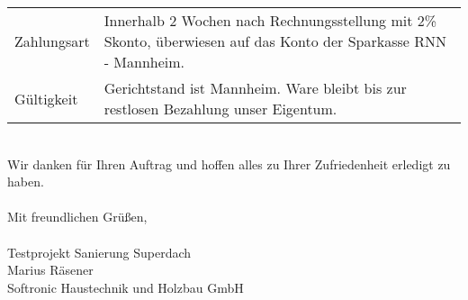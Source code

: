 \documentclass[10pt,a4paper]{letter}
\begin{document}
\begin{letter}
\begin{tabular}{ll}
Zahlungsart & {\parbox[t]{10cm}{Innerhalb 2 Wochen nach Rechnungsstellung mit 2\% Skonto, überwiesen auf das Konto der Sparkasse RNN - Mannheim.}}\\
Gültigkeit & {\parbox[t]{10cm}{Gerichtstand ist Mannheim. Ware bleibt bis zur restlosen Bezahlung unser Eigentum.}}\\
\end{tabular}
\\
Wir danken für Ihren Auftrag und hoffen alles zu Ihrer Zufriedenheit erledigt zu haben.\\
\\
Mit freundlichen Grüßen,\\
\\
Testprojekt Sanierung Superdach
\\
Marius Räsener\\
Softronic Haustechnik und Holzbau GmbH

\end{letter}
\end{document}
